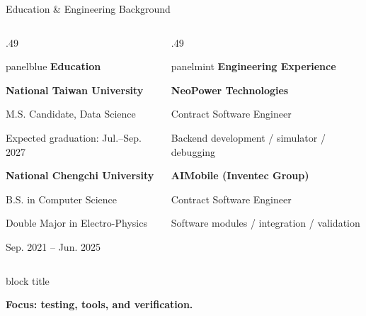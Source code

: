 \documentclass[aspectratio=169,10pt]{beamer}
\newcommand{\takeaway}[1]{%
  \begin{beamercolorbox}[rounded=true,sep=0.13cm,wd=\linewidth]{block title}%
    \raggedright\strut\textbf{#1}\strut
  \end{beamercolorbox}%
}
\begin{document}
\begin{frame}{Education \& Engineering Background}
  \vspace{.07cm}
  \begin{columns}[T,onlytextwidth]
  \begin{column}{.49\textwidth}
    \begin{beamercolorbox}[rounded=true,sep=.21cm,wd=\linewidth]{panelblue}
      {\large\bfseries\color{AccentBlue}Education}\par\vspace{.22cm}
      {\normalsize\bfseries National Taiwan University}\par\vspace{.05cm}
      {\normalsize M.S. Candidate, Data Science}\par
      {\small\color{Muted}Expected graduation: Jul.--Sep. 2027}\par
      \vspace{.35cm}{\color{Divider}\rule{.96\linewidth}{.5pt}}\par\vspace{.22cm}
      {\normalsize\bfseries National Chengchi University}\par\vspace{.05cm}
      {\normalsize B.S. in Computer Science}\par
      {\normalsize Double Major in Electro-Physics}\par
      {\small\color{Muted}Sep. 2021 -- Jun. 2025}\par
    \end{beamercolorbox}
  \end{column}
  \begin{column}{.49\textwidth}
    \begin{beamercolorbox}[rounded=true,sep=.21cm,wd=\linewidth]{panelmint}
      {\large\bfseries\color{Accent}Engineering Experience}\par\vspace{.22cm}
      {\normalsize\bfseries NeoPower Technologies}\par\vspace{.05cm}
      {\normalsize Contract Software Engineer}\par
      {\small\color{Muted}Backend development / simulator / debugging}\par
      \vspace{.34cm}{\color{Divider}\rule{.96\linewidth}{.5pt}}\par\vspace{.22cm}
      {\normalsize\bfseries AIMobile (Inventec Group)}\par\vspace{.05cm}
      {\normalsize Contract Software Engineer}\par
      {\small\color{Muted}Software modules / integration / validation}\par
    \end{beamercolorbox}
  \end{column}
  \end{columns}
  \vspace{.26cm}
  \takeaway{Focus: testing, tools, and verification.}
\end{frame}
\end{document}

